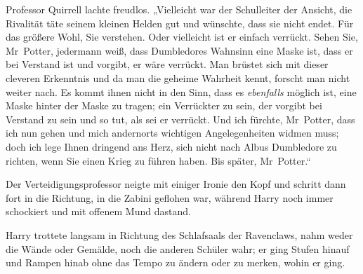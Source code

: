 Professor Quirrell lachte freudlos. „Vielleicht war der Schulleiter der Ansicht, die Rivalität täte seinem kleinen Helden gut und wünschte, dass sie nicht endet. Für das größere Wohl, Sie verstehen. Oder vielleicht ist er einfach verrückt. Sehen Sie, Mr~Potter, jedermann weiß, dass Dumbledores Wahnsinn eine Maske ist, dass er bei Verstand ist und vorgibt, er wäre verrückt. Man brüstet sich mit dieser cleveren Erkenntnis und da man die geheime Wahrheit kennt, forscht man nicht weiter nach. Es kommt ihnen nicht in den Sinn, dass es \emph{ebenfalls} möglich ist, eine Maske hinter der Maske zu tragen; ein Verrückter zu sein, der vorgibt bei Verstand zu sein und so tut, als sei er verrückt. Und ich fürchte, Mr~Potter, dass ich nun gehen und mich andernorts wichtigen Angelegenheiten widmen muss; doch ich lege Ihnen dringend ans Herz, sich nicht nach Albus Dumbledore zu richten, wenn Sie einen Krieg zu führen haben. Bis später, Mr~Potter.“

Der Verteidigungsprofessor neigte mit einiger Ironie den Kopf und schritt dann fort in die Richtung, in die Zabini geflohen war, während Harry noch immer schockiert und mit offenem Mund dastand.


Harry trottete langsam in Richtung des Schlafsaals der Ravenclaws, nahm weder die Wände oder Gemälde, noch die anderen Schüler wahr; er ging Stufen hinauf und Rampen hinab ohne das Tempo zu ändern oder zu merken, wohin er ging.


